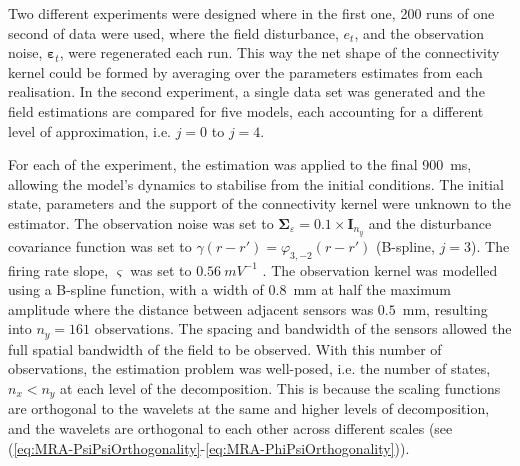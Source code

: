 \documentclass[11pt,draftcls,onecolumn,peerreview]{IEEEtran}
\begin{document}
Two different experiments were designed where in the first one, 200 runs of one second of data were used, where the field disturbance, $e_t$, and the observation noise, $\boldsymbol\varepsilon_t$, were regenerated each run. This way the net shape of the connectivity kernel could be formed by averaging over the parameters estimates from each realisation. In the second experiment, a single data set was generated and the field estimations are compared for five models, each accounting for a different level of approximation, i.e. $j=0$ to $j=4$. 

For each of the experiment, the estimation was applied to the final 900~ms, allowing the model's dynamics to stabilise from the initial conditions. The initial state, parameters and the support of the connectivity kernel were unknown to the estimator. The observation noise was set to $\boldsymbol\Sigma_{\varepsilon}=0.1 \times \mathbf{I}_{n_y}$ and the disturbance covariance function was set to $\gamma(r-r') = \varphi_{3,-2}(r-r')$ (B-spline, $j=3$).  The firing rate slope, $\varsigma$ was set to $0.56~mV^{-1}$ \cite{Wendling2005}. The observation kernel was modelled using a B-spline function, with a width of 0.8~mm at half the maximum amplitude where the distance between adjacent sensors was $0.5$~mm, resulting into $n_y = 161$ observations. The spacing and bandwidth of the sensors allowed the full spatial bandwidth of the field to be observed.  With this number of observations, the estimation problem was well-posed, i.e. the number of states, $n_x < n_y$ at each level of the decomposition. This is because the scaling functions are orthogonal to the wavelets at the same and higher levels of decomposition, and  the wavelets are orthogonal to each other across different scales (see (\ref{eq:MRA-PsiPsiOrthogonality}-\ref{eq:MRA-PhiPsiOrthogonality})). 
\end{document}
